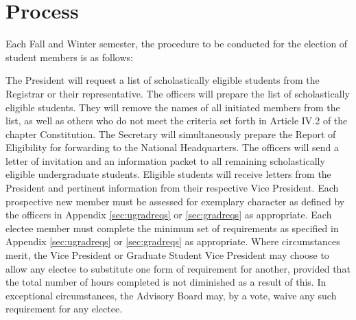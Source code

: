 \section{Process} Each Fall and Winter semester, the procedure to be conducted for the election of student members is as follows:
\begin{enumsubsection}
\itemnotoc  The President will request a list of scholastically eligible students from the Registrar  or their representative.
\itemnotoc The officers will prepare the list of scholastically eligible students. They will remove the names of all initiated members from the list, as well as others who do not meet the criteria set forth in Article IV.2 of the chapter Constitution. The Secretary will simultaneously prepare the Report of Eligibility for forwarding to the National Headquarters.
\itemnotoc The officers will send a letter of invitation and an information packet to all remaining scholastically eligible undergraduate students.
\itemnotoc Eligible students will receive letters from the President and pertinent information from their respective Vice President. %
\itemnotoc Each prospective new member must be assessed for exemplary character as defined by the officers in Appendix \ref{sec:ugradreqs} or \ref{sec:gradreqs} as appropriate. %
\itemnotoc  Each electee member must complete the minimum set of requirements as specified in Appendix \ref{sec:ugradreqs} or \ref{sec:gradreqs} as appropriate. Where circumstances merit, the Vice President or Graduate Student Vice President may choose to allow any electee to substitute one form of requirement for another, provided that the total number of hours completed is not diminished as a result of this. In exceptional circumstances, the Advisory Board may, by a  vote, waive any such requirement for any electee.


\end{enumsubsection}
